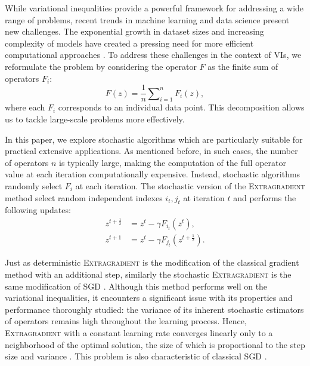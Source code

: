 \documentclass{article}
\begin{document}
While variational inequalities provide a powerful framework for addressing a wide range of problems, recent trends in machine learning and data science present new challenges. The exponential growth in dataset sizes and increasing complexity of models have created a pressing need for more efficient computational approaches \citep{bottou2010large, dean2012large, medyakov2023optimal}. To address these challenges in the context of VIs, we reformulate the problem by considering the operator $F$ as the finite sum of operators $F_i$:
\begin{equation}\label{eq:finite-sum}
    F(z) = \frac{1}{n}\sum\nolimits_{i=1}^n F_i(z),
\end{equation}
where each $F_i$ corresponds to an individual data point. This decomposition allows us to tackle large-scale problems more effectively.

In this paper, we explore stochastic algorithms which are particularly suitable for practical extensive applications. As mentioned before, in such cases, the number of operators $n$ is typically large, making the computation of the full operator value at each iteration computationally expensive. Instead, stochastic algorithms randomly select $F_i$ at each iteration. The stochastic version of the \textsc{Extragradient} method \citep{juditsky2011solving} select random independent indexes $i_t, j_t$ at iteration $t$ and performs the following updates:
\begin{equation}\label{eq:egstep}
    \begin{aligned}
        z^{t+\frac{1}{2}} &= z^t - \gamma F_{i_t} (z^t),\\
        z^{t+1} &= z^t - \gamma F_{j_t} (z^{t + \frac{1}{2}}).
    \end{aligned}
\end{equation}
\vspace{-4mm}

Just as deterministic \textsc{Extragradient} is the modification of the classical gradient method with an additional step, similarly the stochastic \textsc{Extragradient} is the same modification of \textsc{SGD} \citep{robbins1951stochastic}. Although this method performs well on the variational inequalities, it encounters a significant issue with its properties and performance thoroughly studied: the variance of its inherent stochastic estimators of operators remains high throughout the learning process. Hence, \textsc{Extragradient} with a constant learning rate converges linearly only to a neighborhood of the optimal solution, the size of which is proportional to the step size and variance \citep{juditsky2011solving}. This problem is also characteristic of classical \textsc{SGD} \citep{bottou2009curiously, moulines2011non, gower2020variance}. 
\end{document}
